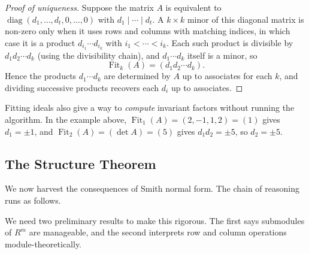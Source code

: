 \documentclass[a4paper]{scrartcl}
\begin{document}
\begin{proof}[Proof of uniqueness]
	Suppose the matrix $A$ is equivalent to $\operatorname{diag}(d_1, \dots, d_t, 0, \dots, 0)$ with $d_1 \mid \cdots \mid d_t$. A $k \times k$ minor of this diagonal matrix is non-zero only when it uses rows and columns with matching indices, in which case it is a product $d_{i_1}\cdots d_{i_k}$ with $i_1 < \cdots < i_k$. Each such product is divisible by $d_1 d_2 \cdots d_k$ (using the divisibility chain), and $d_1 \cdots d_k$ itself is a minor, so
	$$
	\operatorname{Fit}_k(A) = (d_1 d_2 \cdots d_k).
	$$
	Hence the products $d_1 \cdots d_k$ are determined by $A$ up to associates for each $k$, and dividing successive products recovers each $d_i$ up to associates.
\end{proof}

\begin{remark}
	Fitting ideals also give a way to \emph{compute} invariant factors without running the algorithm. In the example above, $\operatorname{Fit}_1(A) = (2, -1, 1, 2) = (1)$ gives $d_1 = \pm 1$, and $\operatorname{Fit}_2(A) = (\det A) = (5)$ gives $d_1 d_2 = \pm 5$, so $d_2 = \pm 5$.
\end{remark}

\subsection{The Structure Theorem}

We now harvest the consequences of Smith normal form. The chain of reasoning runs as follows.

\begin{center}
\end{center}

We need two preliminary results to make this rigorous. The first says submodules of $R^m$ are manageable, and the second interprets row and column operations module-theoretically.
\end{document}
